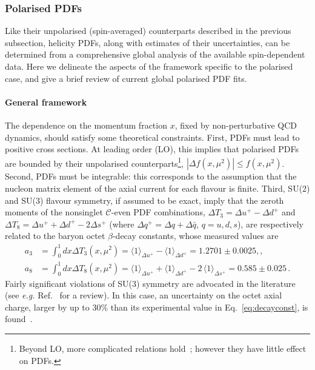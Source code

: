 \subsubsection{Polarised PDFs}
\label{sec:polPDFs}

Like their unpolarised (spin-averaged) counterparts described in the previous 
subsection, helicity PDFs, along with estimates of their uncertainties, can be 
determined from a comprehensive global analysis of the available spin-dependent 
data. 
%
Here we delineate the aspects of the framework specific to the polarised
case, and give a brief review of current global polarised PDF fits.

\paragraph{General framework}
%
The dependence on the momentum fraction $x$, fixed by non-perturbative QCD 
dynamics, should satisfy some theoretical constraints.
%
First, PDFs must lead to positive cross sections.
At leading order (LO), this implies that polarised 
PDFs are bounded by their unpolarised counterparts\footnote{Beyond LO, more 
complicated relations hold~\cite{Altarelli:1998gn}; however they have little
effect on PDFs.}, $|\Delta f(x,\mu^2)|\leq f(x,\mu^2)$.
%
Second, PDFs must be integrable: this corresponds to the assumption 
that the nucleon matrix element of the axial current for each flavour is finite.
%
Third, SU(2) and SU(3) flavour symmetry, if assumed to be exact, imply that 
the zeroth moments of the nonsinglet $\mathcal{C}$-even PDF combinations,
$\Delta T_3=\Delta u^+ -\Delta d^+$ and 
$\Delta T_8 = \Delta u^+ +\Delta d^+ -2\Delta s^+$ 
(where $\Delta q^+=\Delta q+\Delta\bar{q}$, $q=u,d,s$), are respectively
related to the baryon octet $\beta$-decay constants, whose 
measured values are~\cite{Olive:2016xmw}
\begin{align}
 a_3
 & =
 \int_0^1 dx \Delta T_3 (x,\mu^2)
 = \langle 1\rangle_{\Delta u^+} - \langle 1\rangle_{\Delta d^+}  = 1.2701 \pm 0.0025
 ,,\\
 a_8
 & =
 \int_0^1 dx \Delta T_8 (x,\mu^2)
 = \langle 1 \rangle_{\Delta u^+} + \langle 1 \rangle_{\Delta d^+} -2\,\langle 1 \rangle_{\Delta s^+} 
 =0.585  \pm 0.025
 \,.
\label{eq:decayconst}
\end{align}
%
Fairly significant violations of SU(3) symmetry are advocated
in the literature (see {\it e.g.} Ref.~\cite{Cabibbo:2003cu} for a review). 
%
In this case, an uncertainty on the octet axial charge, larger by up to $30\%$ 
than its experimental value in Eq.~\eqref{eq:decayconst}, 
is found~\cite{FloresMendieta:1998ii}. 

